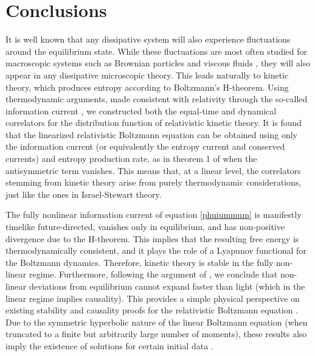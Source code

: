 \documentclass[aps,prd,preprint,nofootinbib,amsmath,amssymb,showpacs,longbibliography,singlecolumn,superscriptaddress,10pt]{revtex4-1}
\theoremstyle{plain}
\theoremstyle{definition}
\begin{document}

\section{Conclusions}

It is well known that any dissipative system will also experience fluctuations around the equilibrium state. While these fluctuations are most often studied for macroscopic systems such as Brownian particles \cite{Dunkel:2008ngc} and viscous fluids \cite{landau_statistical_part_II}, they will also appear in any dissipative microscopic theory. This leads naturally to kinetic theory, which produces entropy according to Boltzmann's H-theorem. Using thermodynamic arguments, made consistent with relativity through the so-called information current \cite{Gavassino:2021kjm}, we constructed both the equal-time and dynamical correlators for the distribution function of relativistic kinetic theory. It is found that the linearized relativistic Boltzmann equation can be obtained using only the information current (or equivalently the entropy current and conserved currents) and entropy production rate, as in theorem 1 of \cite{Gavassino:2023odx} when the antisymmetric term vanishes. 
%
This means that, at a linear level, the correlators stemming from kinetic theory arise from purely thermodynamic considerations, just like the ones in Israel-Stewart theory.

The fully nonlinear information current of equation \eqref{phuiummum} is manifestly timelike future-directed, vanishes only in equilibrium, and has non-positive divergence due to the H-theorem. This implies that the resulting free energy is thermodynamically consistent, and it plays the role of a Lyapunov functional for the Boltzmann dynamics. Therefore, kinetic theory is stable \cite{Gavassino:2021kjm} in the fully non-linear regime. Furthermore, following the argument of \cite{Gavassino:2021kjm}, we conclude that non-linear deviations from equilibrium cannot expand faster than light (which in the linear regime implies causality). This provides a simple physical perspective on existing stability and causality proofs for the relativistic Boltzmann equation \cite{1973CMaPh..33...83B}. Due to the symmetric hyperbolic nature of the linear Boltzmann equation (when truncated to a finite but arbitrarily large number of moments), these results also imply the existence of solutions for certain initial data \cite{Kato1975TheCP}.
\end{document}
